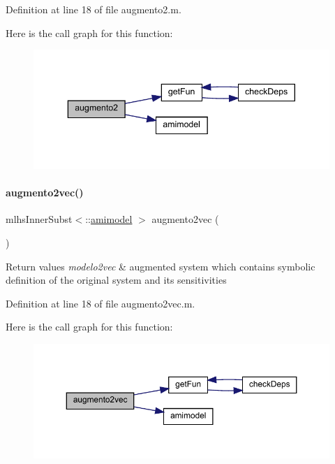 Definition at line 18 of file augmento2.\+m.

Here is the call graph for this function\+:
\nopagebreak
\begin{figure}[H]
\begin{center}
\leavevmode
\includegraphics[width=343pt]{classamimodel_abddb278082c1ff018f3b0ef121bba51a_cgraph}
\end{center}
\end{figure}
\mbox{\label{classamimodel_ab8fea0d36484809cb38e0035a564e919}} 
\paragraph{\texorpdfstring{augmento2vec()}{augmento2vec()}}
{\footnotesize\ttfamily mlhs\+Inner\+Subst$<$\+::\mbox{\hyperlink{classamimodel}{amimodel}} $>$ augmento2vec (\begin{DoxyParamCaption}{ }\end{DoxyParamCaption})}


\begin{DoxyRetVals}{Return values}
{\em modelo2vec} & augmented system which contains symbolic definition of the original system and its sensitivities \\
\hline
\end{DoxyRetVals}


Definition at line 18 of file augmento2vec.\+m.

Here is the call graph for this function\+:
\nopagebreak
\begin{figure}[H]
\begin{center}
\leavevmode
\includegraphics[width=350pt]{classamimodel_ab8fea0d36484809cb38e0035a564e919_cgraph}
\end{center}
\end{figure}
\mbox{\label{classamimodel_a16e01624de4534ac1d1992bd685e2f56}} 
